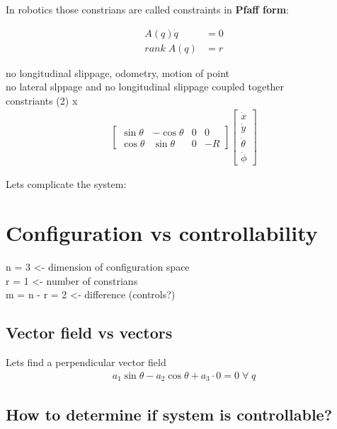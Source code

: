 \documentclass[12pt, a4paper]{extarticle}
\begin{document}
	In robotics those constrians are called constraints in \textbf{Pfaff form}:

	\begin{align}
		A(q)\dot{q} &= 0 \\
		rank \; A(q) &= r
	\end{align}

	no longitudinal slippage, odometry, motion of point\\
	no lateral slppage and no longitudinal slippage coupled together \\
	constriants (2) x
	\begin{align}
		\begin{bmatrix}
			\sin \theta & -\cos \theta & 0 & 0 \\
			\cos \theta & \sin \theta & 0 & -R
		\end{bmatrix}
		\begin{bmatrix}
			\dot{x} \\
			\dot{y} \\
			\dot{\theta} \\
			\dot{\phi}
		\end{bmatrix}
	\end{align}

	Lets complicate the system:

	\section{Configuration vs controllability}

	n = 3 <- dimension of configuration space\\
	r = 1 <- number of constrians \\
	m = n - r = 2 <- difference (controls?)

	\subsection{Vector field vs vectors}

	Lets find a perpendicular vector field
	\begin{align}
		a_1 \sin \theta - a_2 \cos \theta + a_3 \cdot 0= 0 \;\forall\; q
	\end{align}

	\subsection{How to determine if system is controllable?}
\end{document}
